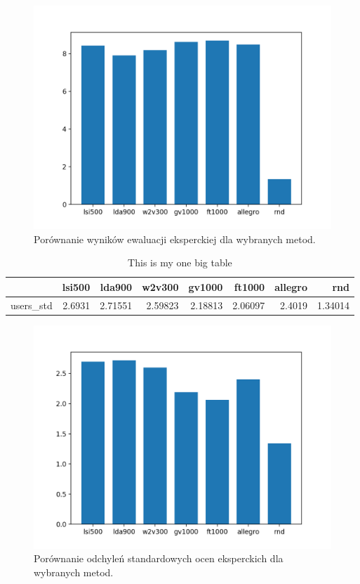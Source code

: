 \documentclass[pl]{minipw} %
\begin{document}
\begin{figure}[H]
	\centering
	\includegraphics[width=1\textwidth]{img/results/lsi500_lda900_w2v300_gv1000_ft1000_allegro_rnd_users.png}
	\caption{Porównanie wyników ewaluacji eksperckiej dla wybranych metod.}
\end{figure}




\begin{table}
	\centering
	\begin{tabular}{lrrrrrrr}
		\hline
		&   lsi500 &   lda900 &   w2v300 &   gv1000 &   ft1000 &   allegro &     rnd \\
		\hline
		users\_std &   2.6931 &  2.71551 &  2.59823 &  2.18813 &  2.06097 &    2.4019 & 1.34014 \\
		\hline
	\end{tabular}
	\caption{This is my one big table}
\end{table}

\begin{figure}[H]
	\centering
	\includegraphics[width=1\textwidth]{img/results/lsi500_lda900_w2v300_gv1000_ft1000_allegro_rnd_users_std.png}
	\caption{Porównanie odchyleń standardowych ocen eksperckich dla wybranych metod.}
\end{figure}
\end{document}
